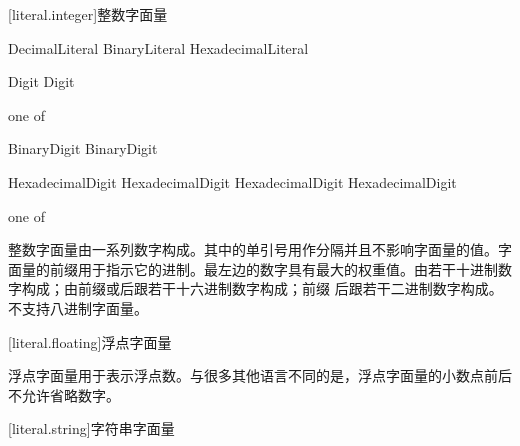 [literal.integer]{整数字面量}

\begin{bnf}
 \br
    DecimalLiteral \br
    BinaryLiteral \br
    HexadecimalLiteral
\end{bnf}

\begin{bnf}
 \br
    Digit \bnflp\terminal{\textquotesingle}\bnfq Digit\bnfrp \bnfs
\end{bnf}

\begin{bnf}
 \textnormal{one of} \br
\end{bnf}

\begin{bnf}
 \br
     BinaryDigit \bnflp\terminal{\textquotesingle}\bnfq BinaryDigit\bnfrp\bnfs
\end{bnf}

\begin{bnf}
 \br
     \br
\end{bnf}

\begin{bnf}
 \br
     HexadecimalDigit \bnflp\terminal{\textquotesingle}\bnfq HexadecimalDigit\bnfrp\bnfs
     HexadecimalDigit \bnflp\terminal{\textquotesingle}\bnfq HexadecimalDigit\bnfrp\bnfs
\end{bnf}

\begin{bnf}
 \textnormal{one of} \br
     \br
     \br
\end{bnf}

\pnum
整数字面量由一系列数字构成。其中的单引号用作分隔并且不影响字面量的值。字面量的前缀用于指示它的进制。最左边的数字具有最大的权重值。由若干十进制数字构成；由前缀或后跟若干十六进制数字构成；前缀  后跟若干二进制数字构成。\X 不支持八进制字面量。

[literal.floating]{浮点字面量}

\pnum
浮点字面量用于表示浮点数。与很多其他语言不同的是，浮点字面量的小数点前后不允许省略数字。

[literal.string]{字符串字面量}

